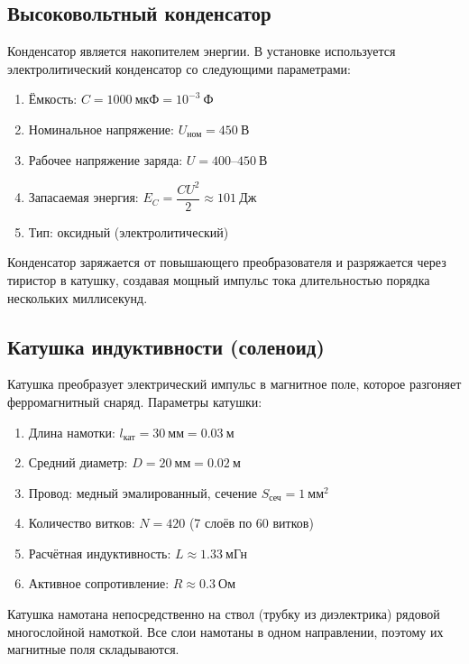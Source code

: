 \documentclass[14pt]{extarticle}
\begin{document}
\subsection{Высоковольтный конденсатор}
Конденсатор является накопителем энергии. В установке используется электролитический конденсатор со следующими параметрами:
\begin{enumerate}
    \item Ёмкость: $C = 1000 \ \text{мкФ} = 10^{-3} \ \text{Ф}$
    \item Номинальное напряжение: $U_{\text{ном}} = 450 \ \text{В}$
    \item Рабочее напряжение заряда: $U = 400 \text{--} 450 \ \text{В}$
    \item Запасаемая энергия: $E_C = \dfrac{C U^2}{2} \approx 101 \ \text{Дж}$
    \item Тип: оксидный (электролитический)
\end{enumerate}
Конденсатор заряжается от повышающего преобразователя и разряжается через тиристор в катушку, создавая мощный импульс тока длительностью порядка нескольких миллисекунд.

\subsection{Катушка индуктивности (соленоид)}
Катушка преобразует электрический импульс в магнитное поле, которое разгоняет ферромагнитный снаряд. Параметры катушки:
\begin{enumerate}
    \item Длина намотки: $l_{\text{кат}} = 30 \ \text{мм} = 0.03 \ \text{м}$
    \item Средний диаметр: $D = 20 \ \text{мм} = 0.02 \ \text{м}$
    \item Провод: медный эмалированный, сечение $S_{\text{сеч}} = 1 \ \text{мм}^2$
    \item Количество витков: $N = 420$ (7 слоёв по 60 витков)
    \item Расчётная индуктивность: $L \approx 1.33 \ \text{мГн}$
    \item Активное сопротивление: $R \approx 0.3 \ \text{Ом}$
\end{enumerate}
Катушка намотана непосредственно на ствол (трубку из диэлектрика) рядовой многослойной намоткой. Все слои намотаны в одном направлении, поэтому их магнитные поля складываются.
\end{document}
